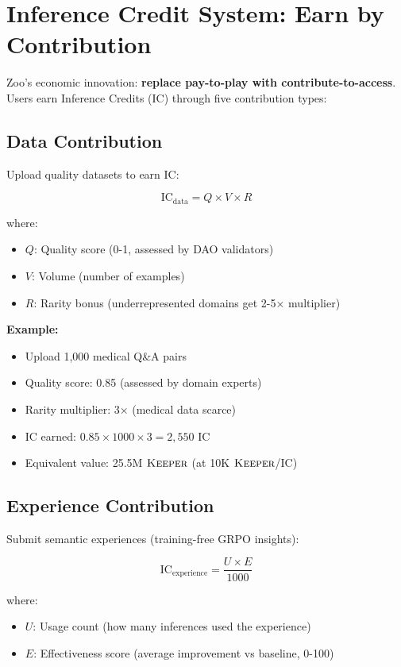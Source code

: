\section{Inference Credit System: Earn by Contribution}


Zoo's economic innovation: \textbf{replace pay-to-play with contribute-to-access}. Users earn Inference Credits (IC) through five contribution types:

\subsection{Data Contribution}

Upload quality datasets to earn IC:

\begin{equation}
\text{IC}_{\text{data}} = Q \times V \times R
\end{equation}

where:
\begin{itemize}
\item $Q$: Quality score (0-1, assessed by DAO validators)
\item $V$: Volume (number of examples)
\item $R$: Rarity bonus (underrepresented domains get 2-5× multiplier)
\end{itemize}

\textbf{Example:}
\begin{itemize}
\item Upload 1,000 medical Q\&A pairs
\item Quality score: 0.85 (assessed by domain experts)
\item Rarity multiplier: 3× (medical data scarce)
\item IC earned: $0.85 \times 1000 \times 3 = 2,550$ IC
\item Equivalent value: 25.5M $\textsc{Keeper}$ (at 10K $\textsc{Keeper}$/IC)
\end{itemize}

\subsection{Experience Contribution}

Submit semantic experiences (training-free GRPO insights):

\begin{equation}
\text{IC}_{\text{experience}} = \frac{U \times E}{1000}
\end{equation}

where:
\begin{itemize}
\item $U$: Usage count (how many inferences used the experience)
\item $E$: Effectiveness score (average improvement vs baseline, 0-100)
\end{itemize}


